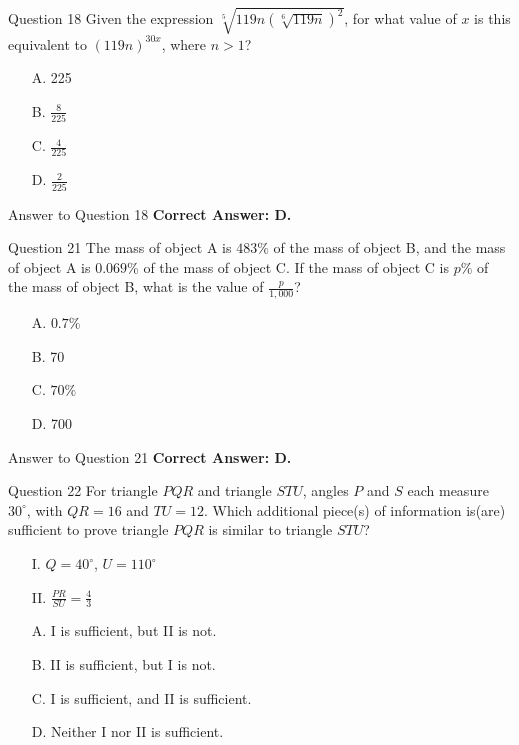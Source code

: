 \documentclass{beamer}
\begin{document}
\begin{frame}{Question 18}
Given the expression $\sqrt[5]{119n \left(\sqrt[6]{119n}\right)^2}$, for what value of $x$ is this equivalent to $(119n)^{30x}$, where $n > 1$?

\begin{itemize}
    \item[A.] 225
    \item[B.] $\frac{8}{225}$
    \item[C.] $\frac{4}{225}$
    \item[D.] $\frac{2}{225}$
\end{itemize}
\end{frame}

\begin{frame}{Answer to Question 18}
\textbf{Correct Answer: D.}
\end{frame}


\begin{frame}{Question 21}
The mass of object A is $483\%$ of the mass of object B, and the mass of object A is $0.069\%$ of the mass of object C.  
If the mass of object C is $p\%$ of the mass of object B, what is the value of $\frac{p}{1,000}$?

\begin{itemize}
    \item[A.] $0.7\%$
    \item[B.] 70
    \item[C.] $70\%$
    \item[D.] 700
\end{itemize}
\end{frame}

\begin{frame}{Answer to Question 21}
\textbf{Correct Answer: D.}
\end{frame}


\begin{frame}{Question 22}
For triangle $PQR$ and triangle $STU$, angles $P$ and $S$ each measure $30^\circ$, with $QR = 16$ and $TU = 12$.  
Which additional piece(s) of information is(are) sufficient to prove triangle $PQR$ is similar to triangle $STU$?

\begin{itemize}
    \item[I.] $Q = 40^\circ$, $U = 110^\circ$
    \item[II.] $\frac{PR}{SU} = \frac{4}{3}$
\end{itemize}

\begin{itemize}
    \item[A.] I is sufficient, but II is not.
    \item[B.] II is sufficient, but I is not.
    \item[C.] I is sufficient, and II is sufficient.
    \item[D.] Neither I nor II is sufficient.
\end{itemize}
\end{frame}
\end{document}
